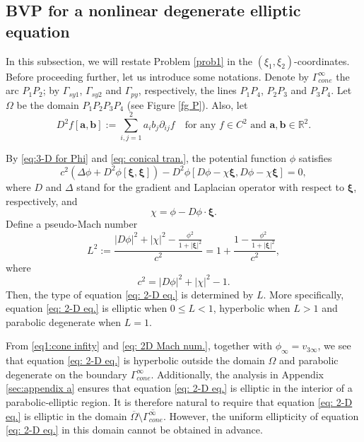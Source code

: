 \documentclass[reqno,12pt]{amsart}
\numberwithin{equation}{section}
\begin{document}
\subsection{BVP for a nonlinear degenerate elliptic equation}\label{sec:2.2}
In this subsection, we will restate Problem \ref{prob1} in the $(\xi_1,\xi_2)$-coordinates. Before proceeding further, let us introduce some notations. Denote by $\Gamma_{cone}^{\infty}$ the arc $P_{1}P_{2}$; by $\Gamma_{sy1}$, $\Gamma_{sy2}$ and $\Gamma_{py}$, respectively, the lines $P_{1}P_{4}$, $P_{2}P_{3}$ and $P_{3}P_{4}$. Let $\Omega$ be the domain $P_{1}P_{2}P_{3}P_{4}$ (see Figure \ref{fg P}). Also, let
\begin{equation*}
	D^{2}f[\bm{a},\bm{b}]:= \sum^{2}_{i,j=1} a_{i}b_{j}\partial_{ij}f\quad\text{for any $f\in C^2$ and $\bm{a},\bm{b}\in\mathbb{R}^{2}$}.
\end{equation*}

By \eqref{eq:3-D for Phi} and \eqref{eq: conical tran.}, the potential function $\phi$ satisfies
\begin{equation}\label{eq: 2-D eq.}
	c^2(\Delta\phi+D^{2}\phi[\bm{\xi},\bm{\xi}])-D^{2}\phi[D\phi-\chi\bm{\xi},D\phi-\chi\bm{\xi}]=0,
\end{equation}
where $D$ and $\Delta$ stand for the gradient and Laplacian operator with respect to $\bm{\xi}$, respectively, and
\begin{equation}\label{eq: velocity3}
	\chi=\phi-D\phi\cdot\bm{\xi}.
\end{equation}
Define a pseudo-Mach number
\begin{equation}\label{eq: 2D Mach num.}
	L^{2}:=\frac{|D\phi|^{2}+|\chi|^{2}-\frac{\phi^{2}}{1+|\bm{\xi}|^{2}}}{c^2}=1+\frac{1-\frac{\phi^{2}}{1+|\bm{\xi}|^{2}}}{c^2},
\end{equation}
where
\begin{equation}\label{eq:2.34}
	c^2=|D\phi|^{2}+|\chi|^{2}-1.
\end{equation}
Then, the type of equation \eqref{eq: 2-D eq.} is determined by $L$. More specifically, equation \eqref{eq: 2-D eq.} is elliptic when $0\leq L<1$, hyperbolic when $L>1$ and parabolic degenerate when $L=1$. 

From \eqref{eq1:cone infity} and \eqref{eq: 2D Mach num.}, together with $\phi_\infty=v_{3\infty}$, we see that equation \eqref{eq: 2-D eq.} is hyperbolic outside the domain $\Omega$ and parabolic degenerate on the boundary $\Gamma_{cone}^{\infty}$. Additionally, the analysis in Appendix \ref{sec:appendix a} ensures that equation \eqref{eq: 2-D eq.} is elliptic in the interior of a parabolic-elliptic region. It is therefore natural to require that equation \eqref{eq: 2-D eq.} is elliptic in the domain $\overline{\Omega}\setminus\overline{\Gamma_{cone}^{\infty}}$. However, the uniform ellipticity of equation \eqref{eq: 2-D eq.} in this domain cannot be obtained in advance.
\end{document}
